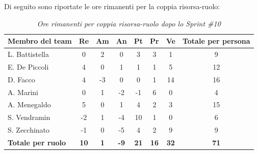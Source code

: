 ﻿\documentclass[a4paper, 10pt, colorlinks=true, linkcolor=black, urlcolor=blue, citecolor=blue, hidelinks]{article}
\renewcommand{\arraystretch}{1.2}
\begin{document}
Di seguito sono riportate le ore rimanenti per la coppia risorsa-ruolo:

\begin{table}[H]
    \centering
    \renewcommand{\arraystretch}{1.4}
    \begin{tabular}{|l|c|c|c|c|c|c|c|}
        \hline
        \rowcolor{bluBitless!15}
        \textbf{Membro del team} & \textbf{Re} & \textbf{Am} & \textbf{An} & \textbf{Pt} & \textbf{Pr} & \textbf{Ve} & \textbf{Totale per persona} \\
        \hline
        L. Battistella & 0 & 2 & 0 & 3 & 3 & 1 & 9 \\ \hline
        E. De Piccoli & 4 & 0 & 1 & 1 & 1 & 5 & 12 \\ \hline
        D. Facco & 4 & -3 & 0 & 0 & 1 & 14 & 16 \\ \hline
        A. Marini & 0 & 1 & -2 & -1 & 6 & 0 & 4 \\ \hline
        A. Menegaldo & 5 & 0 & 1 & 4 & 2 & 3 & 15 \\ \hline
        S. Vendramin & -2 & 1 & -4 & 10 & 1 & 0 & 6 \\ \hline
        S. Zecchinato & -1 & 0 & -5 & 4 & 2 & 9 & 9 \\ \hline
        \rowcolor{bluBitless!8}
        \textbf{Totale per ruolo} & \textbf{10} & \textbf{1} & \textbf{-9} & \textbf{21} & \textbf{16} & \textbf{32} & \textbf{71} \\
        \hline
    \end{tabular}
    \caption{\textit{Ore rimanenti per coppia risorsa-ruolo dopo lo Sprint \#10}}
\end{table}
\end{document}
